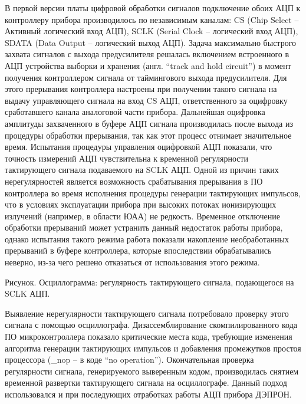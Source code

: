 \documentclass[a4paper,portrait,12pt]{article}
\begin{document}
{{{{В первой версии платы цифровой обработки сигналов подключение обоих АЦП к контроллеру прибора производилось по независимым каналам: CS (Chip Select -- Активный логический вход АЦП), SCLK (Serial Clock -- логический вход АЦП), SDATA (Data Output -- логический выход АЦП). Задача максимально быстрого захвата сигналов с выхода предусилителя решалась включением встроенного в АЦП устройства выборки и хранения (англ. {``}track and hold circuit'') в момент получения контроллером сигнала от таймингового выхода предусилителя. Для этого прерывания контроллера настроены при получении такого сигнала на выдачу управляющего сигнала на вход CS АЦП, ответственного за оцифровку сработавшего канала аналоговой части прибора. Дальнейшая оцифровка амплитуды захваченного в буфере АЦП сигнала производилась после выхода из процедуры обработки прерывания, так как этот процесс отнимает значительное время. Испытания процедуры управления оцифровкой АЦП показали, что точность измерений АЦП чувствительна к временной регулярности тактирующего сигнала подаваемого на SCLK АЦП. Одной из причин таких нерегулярностей является возможность срабатывания прерывания в ПО контроллера во время исполнения процедуры генерации тактирующих импульсов, что в условиях эксплуатации прибора при высоких потоках ионизирующих излучений (например, в области ЮАА) не редкость. Временное отключение обработки прерываний может устранить данный недостаток работы прибора, однако испытания такого режима работа показали накопление необработанных прерываний в буфере контроллера, которые впоследствии обрабатывались неверно, из-за чего решено отказаться от использования этого режима.





Рисунок. Осциллограмма: регулярность тактирующего сигнала, подающегося на SCLK АЦП.


Выявление нерегулярности тактирующего сигнала потребовало проверку этого сигнала с помощью осциллографа. Дизассемблирование скомпилированного кода ПО микроконтроллера показало критические места кода, требующие изменения алгоритма генерации тактирующих импульсов и добавления промежутков простоя процессора (\_nop -- в коде {``}no operation''). Окончательная проверка регулярности сигнала, генерируемого выверенным кодом, производилась снятием временной развертки тактирующего сигнала  на осциллографе. Данный подход использовался и при последующих отработках работы АЦП прибора ДЭПРОН.





}}}}
\end{document}
